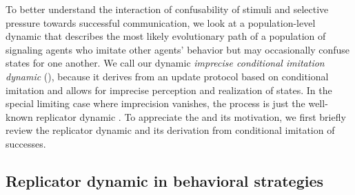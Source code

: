 \documentclass[fleqn,reqno,10pt]{article}
\newcommand{\icid}{\acro{icid}} %
\begin{document}
To better understand the interaction of confusability of stimuli and selective pressure towards
successful communication, we look at a population-level dynamic that describes the most likely
evolutionary path of a population of signaling agents who imitate other agents' behavior but
may occasionally confuse states for one another. We call our dynamic \emph{imprecise
  conditional imitation dynamic} (\icid), because it derives from an update protocol based on
conditional imitation and allows for imprecise perception and realization of states. In the
special limiting case where imprecision vanishes, the process is just the well-known replicator
dynamic \citep{TaylorJonker1978:Evolutionary-St}. To appreciate the \icid and its motivation,
we first briefly review the replicator dynamic and its derivation from conditional imitation of
successes.



\subsection{Replicator dynamic in behavioral strategies}
\label{sec:repl-dynam-behav}
\end{document}
